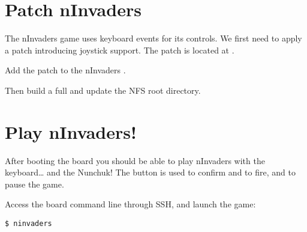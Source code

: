 \section{Patch nInvaders}

The nInvaders game uses keyboard events for its controls. We first need to apply
a patch introducing joystick support. The patch is located at
.

Add the patch to the nInvaders .

Then build a full  and update the NFS root
directory.

\section{Play nInvaders!}

After booting the board you should be able to play nInvaders with the
keyboard\dots{} and the Nunchuk! The  button is used to confirm and to
fire, and  to pause the game.

Access the board command line through SSH, and launch the game:
\begin{verbatim}
$ ninvaders
\end{verbatim}
